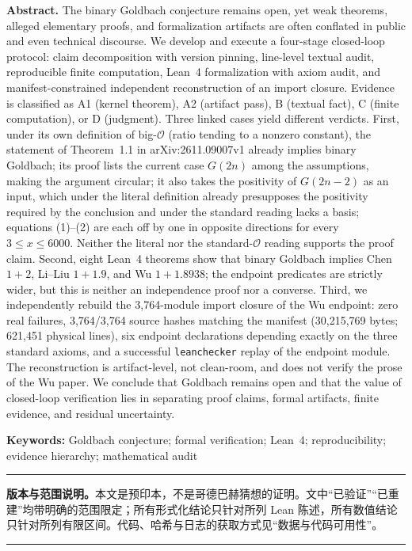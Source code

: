 \documentclass[11pt,a4paper]{ctexart}
\theoremstyle{plain}
\theoremstyle{definition}
\begin{document}
\noindent\textbf{Abstract.}
The binary Goldbach conjecture remains open, yet weak theorems, alleged elementary proofs, and formalization artifacts are often conflated in public and even technical discourse. We develop and execute a four-stage closed-loop protocol: claim decomposition with version pinning, line-level textual audit, reproducible finite computation, Lean~4 formalization with axiom audit, and manifest-constrained independent reconstruction of an import closure. Evidence is classified as A1 (kernel theorem), A2 (artifact pass), B (textual fact), C (finite computation), or D (judgment). Three linked cases yield different verdicts. First, under its own definition of big-$\mathcal O$ (ratio tending to a nonzero constant), the statement of Theorem~1.1 in arXiv:2611.09007v1 already implies binary Goldbach; its proof lists the current case $G(2n)$ among the assumptions, making the argument circular; it also takes the positivity of $G(2n-2)$ as an input, which under the literal definition already presupposes the positivity required by the conclusion and under the standard reading lacks a basis; equations (1)--(2) are each off by one in opposite directions for every $3\le x\le 6000$. Neither the literal nor the standard-$\mathcal O$ reading supports the proof claim. Second, eight Lean~4 theorems show that binary Goldbach implies Chen $1+2$, Li--Liu $1+1.9$, and Wu $1+1.8938$; the endpoint predicates are strictly wider, but this is neither an independence proof nor a converse. Third, we independently rebuild the 3,764-module import closure of the Wu endpoint: zero real failures, 3,764/3,764 source hashes matching the manifest (30,215,769 bytes; 621,451 physical lines), six endpoint declarations depending exactly on the three standard axioms, and a successful \texttt{leanchecker} replay of the endpoint module. The reconstruction is artifact-level, not clean-room, and does not verify the prose of the Wu paper. We conclude that Goldbach remains open and that the value of closed-loop verification lies in separating proof claims, formal artifacts, finite evidence, and residual uncertainty.

\vspace{0.4em}
\noindent\textbf{Keywords:} Goldbach conjecture; formal verification; Lean~4; reproducibility; evidence hierarchy; mathematical audit

\vspace{0.4em}
\noindent\rule{\textwidth}{0.4pt}
\begin{flushleft}
\small
\textbf{版本与范围说明。}本文是预印本，不是哥德巴赫猜想的证明。文中“已验证”“已重建”均带明确的范围限定；所有形式化结论只针对所列 Lean 陈述，所有数值结论只针对所列有限区间。代码、哈希与日志的获取方式见“数据与代码可用性”。
\end{flushleft}
\noindent\rule{\textwidth}{0.4pt}
\end{document}
